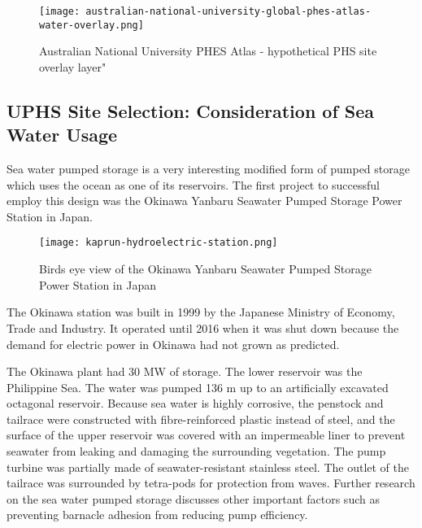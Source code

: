 \documentclass[hidelinks,12pt,a4paper]{article}
\begin{document}
\begin{figure}[ht!]
    \centering
    \texttt{[image: australian-national-university-global-phes-atlas-water-overlay.png]}
    \caption{Australian National University PHES Atlas - hypothetical PHS site overlay layer" \cite{AustralianNationalUniversityGlobalPHESAtlas}}
\end{figure}
\FloatBarrier

\subsection{UPHS Site Selection: Consideration of Sea Water Usage}
Sea water pumped storage is a very interesting modified form of pumped storage which uses the ocean as one of its reservoirs. The first project to successful employ this design was the Okinawa Yanbaru Seawater Pumped Storage Power Station in Japan. \cite{SeaWaterPumpedStoragePowerPlant}

\begin{figure}[ht!]
    \centering
    \texttt{[image: kaprun-hydroelectric-station.png]}
    \caption{Birds eye view of the Okinawa Yanbaru Seawater Pumped Storage Power Station in Japan \cite{DevelopmentOfPumpTurbineForSeawaterPumpedStorage}}
\end{figure}

The Okinawa station was built in 1999 by the Japanese Ministry of Economy, Trade and Industry. It operated until 2016 when it was shut down because the demand for electric power in Okinawa had not grown as predicted. \cite{ExperimentalPowerPlantInKunigamiDismantled}

The Okinawa plant had 30 MW of storage. The lower reservoir was the Philippine Sea. The water was pumped 136 m up to an artificially excavated octagonal reservoir. Because sea water is highly corrosive, the
penstock and tailrace were constructed with fibre-reinforced plastic instead of steel, and the surface of the upper reservoir was covered with an impermeable liner to prevent seawater from leaking and damaging the surrounding vegetation. The pump turbine was partially made of seawater-resistant stainless steel. \cite{SeaWaterPumpedStoragePowerPlant} The outlet of the tailrace was  surrounded by tetra-pods for protection from waves. \cite{DevelopmentOfPumpTurbineForSeawaterPumpedStorage} Further research on the sea water pumped storage discusses other important factors such as preventing barnacle adhesion from reducing pump efficiency. \cite{DevelopmentOfPumpTurbineForSeawaterPumpedStorage}
\end{document}
